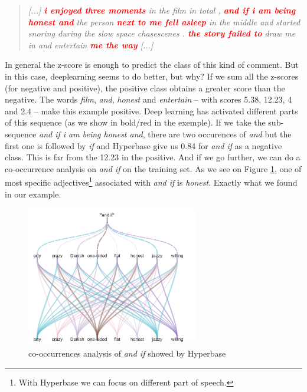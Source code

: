 \begin{quote}
\textit{[...] \textcolor{red}{\textbf{i enjoyed three moments}} in the film in total , \textcolor{red}{\textbf{and if i am being honest and}} the person \textcolor{red}{\textbf{next to me fell asleep}} in the middle and started snoring during the slow space chasescenes . \textcolor{red}{\textbf{the story failed to}} draw me in and entertain \textcolor{red}{\textbf{me the way}} [...]} 
\end{quote}%

In general the z-score is enough to predict the class of this kind of comment. But in this case, deeplearning seems to do better, but why? If we sum all the z-scores (for negative and positive), the positive class obtains a greater score than the negative. The words \textit{film}, \textit{and}, \textit{honest} and \textit{entertain} -- with scores 5.38, 12.23, 4 and 2.4 -- make this example positive. Deep learning has activated different parts of this sequence (as we show in bold/red in the exemple). If we take the sub-sequence \textit{and if i am being honest and}, there are two occurences of \textit{and} but the first one is followed by \textit{if} and Hyperbase give us 0.84 for \textit{and if} as a negative class. This is far from the 12.23 in the positive. And if we go further, we can do a co-occurrence analysis on \textit{and if} on the training set. As we see on Figure \ref{and_if}, one of most specific adjectives\footnote{With Hyperbase we can focus on different part of speech.} associated with \textit{and if} is \textit{honest}. Exactly what we found in our example. 

\begin{figure}[h]
\begin{center}
\includegraphics[width=7.5cm]{img/cooc_english2.png}
\caption{co-occurrences analysis of \textit{and if} showed by Hyperbase}
\label{and_if}
\end{center}
\end{figure}

